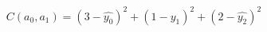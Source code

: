 \documentclass[preview]{standalone}
\begin{document}
\begin{align*}
C(a_0, a_1) = (3 - \hat{y_0})^2 + (1 - \hat{y_1})^2 + (2 - \hat{y_2})^2
\end{align*}
\end{document}
